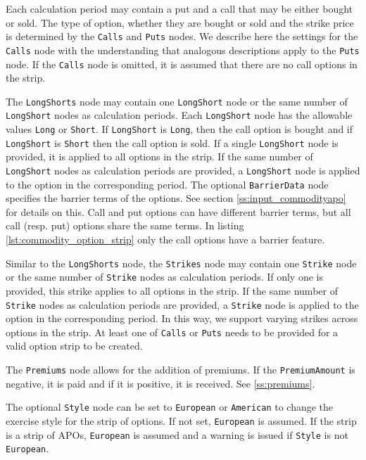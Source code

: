 Each calculation period may contain a put and a call that may be either bought or sold. The type of option, whether they are bought or sold and the strike price is determined by the \lstinline!Calls! and \lstinline!Puts! nodes. We describe here the settings for the \lstinline!Calls! node with the understanding that analogous descriptions apply to the \lstinline!Puts! node. If the \lstinline!Calls! node is omitted, it is assumed that there are no call options in the strip. 

The \lstinline!LongShorts! node may contain one \lstinline!LongShort! node or the same number of \lstinline!LongShort! nodes as calculation periods. Each \lstinline!LongShort! node has the allowable values \lstinline!Long! or \lstinline!Short!. If \lstinline!LongShort! is \lstinline!Long!, then the call option is bought and if \lstinline!LongShort! is \lstinline!Short! then the call option is sold. If a single \lstinline!LongShort! node is provided, it is applied to all options in the strip. If the same number of \lstinline!LongShort! nodes as calculation periods are provided, a \lstinline!LongShort! node is applied to the option in the corresponding period. The optional \lstinline!BarrierData! node specifies the barrier terms of the options. See section \ref{ss:input_commodityapo} for details on this. Call and put options can have different barrier terms, but all call (resp. put) options share the same terms. In listing \ref{lst:commodity_option_strip} only the call options have a barrier feature.

Similar to the \lstinline!LongShorts! node, the \lstinline!Strikes! node may contain one \lstinline!Strike! node or the same number of \lstinline!Strike! nodes as calculation periods. If only one is provided, this strike applies to all options in the strip. If the same number of \lstinline!Strike! nodes as calculation periods are provided, a \lstinline!Strike! node is applied to the option in the corresponding period. In this way, we support varying strikes across options in the strip. At least one of \lstinline!Calls! or \lstinline!Puts! needs to be provided for a valid option strip to be created.

The \lstinline!Premiums! node allows for the addition of premiums. If the \lstinline!PremiumAmount! is negative, it is paid and if it is positive, it is received. See \ref{ss:premiums}.

The optional \lstinline!Style! node can be set to \lstinline!European! or \lstinline!American! to change the exercise style for the strip of options. If not set, \lstinline!European! is assumed. If the strip is a strip of APOs, \lstinline!European! is assumed and a warning is issued if \lstinline!Style! is not \lstinline!European!.

